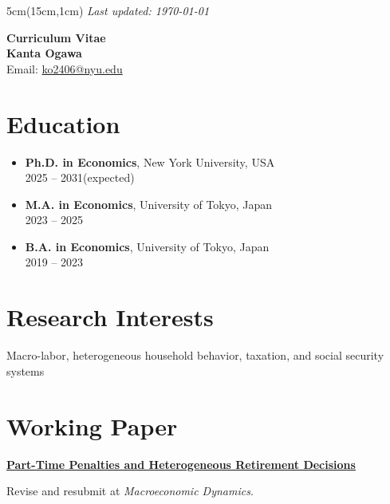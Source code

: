 \documentclass[11pt]{article}
\begin{document}
\begin{textblock*}{5cm}(15cm,1cm)
  \raggedleft
  \textit{Last updated: \today}
\end{textblock*}

\begin{center}
    {\LARGE \textbf{Curriculum Vitae}}\\
    \vspace{0.5em}
    \textbf{Kanta Ogawa}\\
    Email: \href{mailto:ko2406@nyu.edu}{ko2406@nyu.edu}
\end{center}

\vspace{1em}

\section*{Education}
\begin{itemize}[leftmargin=1.5em]
  \item \textbf{Ph.D. in Economics}, New York University, USA \\
  2025 -- 2031(expected)
  \item \textbf{M.A. in Economics}, University of Tokyo, Japan \\
  2023 -- 2025
  \item \textbf{B.A. in Economics}, University of Tokyo, Japan \\
  2019 -- 2023
\end{itemize}

\section*{Research Interests}
Macro-labor, heterogeneous household behavior, taxation, and social security systems

\section*{Working Paper}
\textbf{\href{https://arxiv.org/pdf/2503.17917}{Part-Time Penalties and Heterogeneous Retirement Decisions}}

Revise and resubmit at \textit{Macroeconomic Dynamics}.
\end{document}

